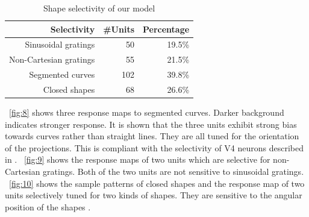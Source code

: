 \documentclass[twocolumn]{article}
\begin{document}
\begin{table}[h]
\caption{Shape selectivity of our model}
\centering
\begin{tabular}{|r|r|r|}
\hline
Selectivity & \#Units & Percentage \\\hline
Sinusoidal gratings & 50 & 19.5\% \\\hline
Non-Cartesian gratings & 55 & 21.5\% \\\hline
Segmented curves & 102 & 39.8\% \\\hline
Closed shapes & 68 & 26.6\% \\\hline
\end{tabular}
\label{tab:1}
\end{table}

\figurename~\ref{fig:8} shows three response maps to segmented curves.
Darker background indicates stronger response.
It is shown that the three units exhibit strong bias towards curves rather than straight lines.
They are all tuned for the orientation of the projections.
This is compliant with the selectivity of V4 neurons described in \cite{pasupathy1999}.
\figurename~\ref{fig:9} shows the response maps of two units which are selective for non-Cartesian gratings.
Both of the two units are not sensitive to sinusoidal gratings.
\figurename~\ref{fig:10} shows the sample patterns of closed shapes and the response map of two units selectively tuned for two kinds of shapes.
They are sensitive to the angular position of the shapes \cite{pasupathy2001}.
\end{document}
